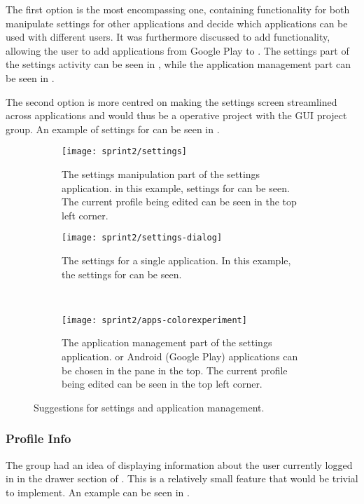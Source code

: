 The first option is the most encompassing one, containing functionality for both manipulate settings for other applications and decide which applications can be used with different users.
It was furthermore discussed to add functionality, allowing the user to add applications from Google Play to \launcher.
The settings part of the settings activity can be seen in , while the application management part can be seen in .

The second option is more centred on making the settings screen streamlined across applications and would thus be a operative project with the GUI project group.
An example of settings for \launcher can be seen in .

\begin{figure}[h] %
\centering
    \begin{subfigure}[t]{.48\textwidth}
    \centering
    \texttt{[image: sprint2/settings]}
    \caption{The settings manipulation part of the settings application. in this example, settings for \launcher can be seen. The current profile being edited can be seen in the top left corner.}
    \label{fig:settingsprototype}
    \end{subfigure}
    \hfill
    \begin{subfigure}[t]{.48\textwidth}
    \centering
    \texttt{[image: sprint2/settings-dialog]}
    \caption{The settings for a single application. In this example, the settings for \launcher can be seen.}
    \label{fig:appsettingsprototype}
    \end{subfigure}\\
    \begin{subfigure}[t]{.48\textwidth}
    \centering
    \texttt{[image: sprint2/apps-colorexperiment]}
    \caption{The application management part of the settings application. \giraf or Android (Google Play) applications can be chosen in the pane in the top. The current profile being edited can be seen in the top left corner.}
    \label{fig:appsmanagement}
    \end{subfigure}
\caption{Suggestions for settings and application management.}
\label{fig:drawerstates}
\end{figure}

\subsubsection{Profile Info}
The group had an idea of displaying information about the user currently logged in in the drawer section of \launcher.
This is a relatively small feature that would be trivial to implement.
An example can be seen in .

